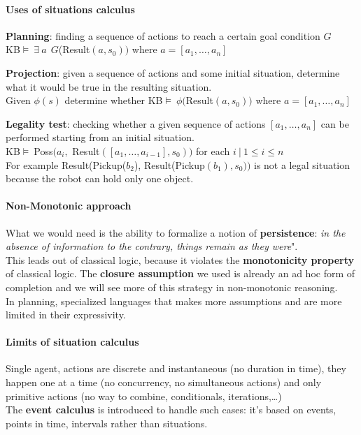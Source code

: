 \documentclass[10pt]{report}
\begin{document}
\paragraph{Uses of situations calculus} \begin{list}{}{}
	\item \textbf{Planning}: finding a sequence of actions to reach a certain goal condition $G$\\
	KB$\vDash\:\exists\:a\:\:G$(Result$(a,s_0))$ where $a = [a_1,\ldots,a_n]$
	\item \textbf{Projection}: given a sequence of actions and some initial situation, determine what it would be true in the resulting situation.\\
	Given $\phi(s)$ determine whether KB$\vDash\:\phi($Result$(a,s_0))$ where $a = [a_1,\ldots,a_n]$
	\item \textbf{Legality test}: checking whether a given sequence of actions $[a_1,\ldots,a_n]$ can be performed starting from an initial situation.\\
	KB$\vDash\:$Poss$(a_i,$ Result$([a_1,\ldots,a_{i-1}],s_0))$ for each $i\:|\:1\leq i\leq n$\\
	For example Result(Pickup($b_2$), Result(Pickup$(b_1),s_0))$ is not a legal situation because the robot can hold only one object.
\end{list}
\paragraph{Non-Monotonic approach} What we would need is the ability to formalize a notion of \textbf{persistence}: \textit{in the absence of information to the contrary, things remain as they were}".\\
This leads out of classical logic, because it violates the \textbf{monotonicity property} of classical logic. The \textbf{closure assumption} we used is already an ad hoc form of completion and we will see more of this strategy in non-monotonic reasoning.\\
In planning, specialized languages that makes more assumptions and are more limited in their expressivity.
\paragraph{Limits of situation calculus} Single agent, actions are discrete and instantaneous (no duration in time), they happen one at a time (no concurrency, no simultaneous actions) and only primitive actions (no way to combine, conditionals, iterations,\ldots)\\
The \textbf{event calculus} is introduced to handle such cases: it's based on events, points in time, intervals rather than situations.
\end{document}
